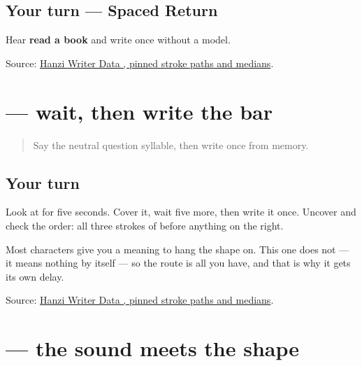\subsection*{Your turn — Spaced Return}
Hear \textbf{read a book} and write  once without a model.

\begin{tcolorbox}[breakable,colback=teal!4,colframe=teal!35!black,title={Before you move on}]
Source: \href{https://raw.githubusercontent.com/chanind/hanzi-writer-data/68d10a4b21150cae5e1ebbd223eed289cf32d90c/data/\%E5\%90\%97.json}{Hanzi Writer Data , pinned stroke paths and medians}.
\end{tcolorbox}
\section[\texorpdfstring{\zh{吗} (ma)}{吗 (ma)}]{ — wait, then write the bar}

\label{lesson:ZH-W19-ma-delayed}



\begin{quote}
Say the neutral question syllable, then write  once from memory.
\end{quote}

\subsection*{Your turn}

Look at \textbf{} for five seconds. Cover it, wait five more, then write it once. Uncover and check the order: all three strokes of  before anything on the right.

Most characters give you a meaning to hang the shape on. This one does not — it means nothing by itself — so the route is all you have, and that is why it gets its own delay.

\begin{tcolorbox}[breakable,colback=teal!4,colframe=teal!35!black,title={Before you move on}]
Source: \href{https://raw.githubusercontent.com/chanind/hanzi-writer-data/68d10a4b21150cae5e1ebbd223eed289cf32d90c/data/\%E5\%90\%97.json}{Hanzi Writer Data , pinned stroke paths and medians}.
\end{tcolorbox}
\section[\texorpdfstring{\zh{吗} (ma)}{吗 (ma)}]{ — the sound meets the shape}

